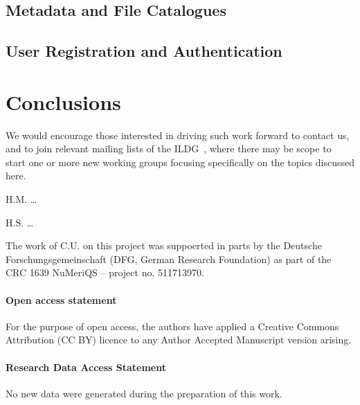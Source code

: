 \documentclass[a4paper,11pt]{article} \usepackage{pos} \usepackage{subcaption}
\begin{document}
\subsection{Metadata and File Catalogues}

\subsection{User Registration and Authentication}

\section{Conclusions}


We would encourage those interested in driving such work forward
to contact us,
and to join relevant mailing lists of the ILDG~\cite{ildg-organization},
where there may be scope to start one or more new working groups
focusing specifically on the topics discussed here.


\acknowledgments

H.M. \dots

H.S. \dots

The work of C.U. on this project was suppoerted in parts by the
Deutsche Forschungsgemeinschaft (DFG, German Research Foundation) as
part of the CRC 1639 NuMeriQS – project no. 511713970. 


\paragraph*{Open access statement}
For the purpose of open access, the authors have applied a Creative Commons
Attribution (CC BY) licence to any Author Accepted Manuscript version arising.

\paragraph*{Research Data Access Statement}
No new data were generated during the preparation of this work.



\end{document}
